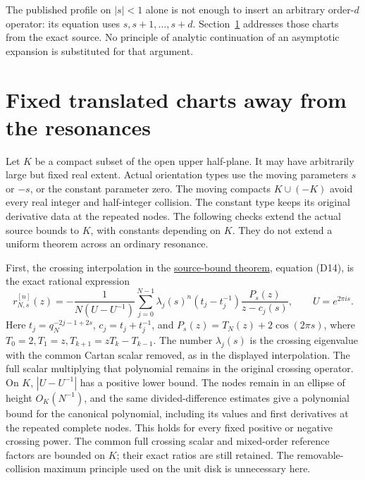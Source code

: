 The published profile on \(|s|<1\) alone is not enough to insert an arbitrary order-\(d\) operator: its equation uses \(s,s+1,\ldots,s+d\). Section~\ref{fc:sec-2} addresses those charts from the exact source. No principle of analytic continuation of an asymptotic expansion is substituted for that argument.

\section{Fixed translated charts away from the resonances}\label{fc:sec-2}

Let \(K\) be a compact subset of the open upper half-plane. It may have arbitrarily large but fixed real extent. Actual orientation types use the moving parameters \(s\) or \(-s\), or the constant parameter zero. The moving compacts \(K\cup(-K)\) avoid every real integer and half-integer collision. The constant type keeps its original derivative data at the repeated nodes. The following checks extend the actual source bounds to \(K\), with constants depending on \(K\). They do not extend a uniform theorem across an ordinary resonance.

First, the crossing interpolation in the \href{https://sashakolpakov.github.io/murakamis_dream/notes/actual_main_meridian_source_bounds.html}{source-bound theorem}, equation (D14), is the exact rational expression
\begin{equation}\label{fc:eq-5}
r_{N,s}^{[n]}(z)=
 -\frac1{N(U-U^{-1})}
 \sum_{j=0}^{N-1}\lambda_j(s)^n(t_j-t_j^{-1})
              \frac{P_s(z)}{z-c_j(s)},\qquad U=e^{2\pi i s}.
\end{equation}
 Here \(t_j=q_N^{-2j-1+2s}\), \(c_j=t_j+t_j^{-1}\), and \(P_s(z)=T_N(z)+2\cos(2\pi s)\), where \(T_0=2,T_1=z,T_{k+1}=zT_k-T_{k-1}\). The number \(\lambda_j(s)\) is the crossing eigenvalue with the common Cartan scalar removed, as in the displayed interpolation. The full scalar multiplying that polynomial remains in the original crossing operator. On \(K\), \(|U-U^{-1}|\) has a positive lower bound. The nodes remain in an ellipse of height \(O_K(N^{-1})\), and the same divided-difference estimates give a polynomial bound for the canonical polynomial, including its values and first derivatives at the repeated complete nodes. This holds for every fixed positive or negative crossing power. The common full crossing scalar and mixed-order reference factors are bounded on \(K\); their exact ratios are still retained. The removable-collision maximum principle used on the unit disk is unnecessary here.

